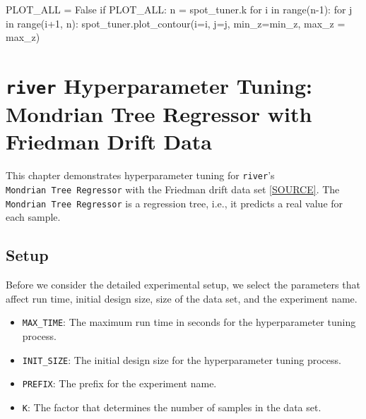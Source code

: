 \documentclass[
  letterpaper,
  DIV=11,
  numbers=noendperiod]{scrreprt}
\newenvironment{Shaded}{\begin{snugshade}}{\end{snugshade}}
\newcommand{\BuiltInTok}[1]{\textcolor[rgb]{0.00,0.23,0.31}{#1}}
\newcommand{\ControlFlowTok}[1]{\textcolor[rgb]{0.00,0.23,0.31}{#1}}
\newcommand{\DecValTok}[1]{\textcolor[rgb]{0.68,0.00,0.00}{#1}}
\newcommand{\KeywordTok}[1]{\textcolor[rgb]{0.00,0.23,0.31}{#1}}
\newcommand{\NormalTok}[1]{\textcolor[rgb]{0.00,0.23,0.31}{#1}}
\newcommand{\OperatorTok}[1]{\textcolor[rgb]{0.37,0.37,0.37}{#1}}
\newcommand{\VariableTok}[1]{\textcolor[rgb]{0.07,0.07,0.07}{#1}}
\providecommand{\tightlist}{%
  \setlength{\itemsep}{0pt}\setlength{\parskip}{0pt}}\usepackage{longtable,booktabs,array}
\begin{document}
\begin{Shaded}
\begin{Highlighting}[]
\NormalTok{PLOT\_ALL }\OperatorTok{=} \VariableTok{False}
\ControlFlowTok{if}\NormalTok{ PLOT\_ALL:}
\NormalTok{    n }\OperatorTok{=}\NormalTok{ spot\_tuner.k}
    \ControlFlowTok{for}\NormalTok{ i }\KeywordTok{in} \BuiltInTok{range}\NormalTok{(n}\OperatorTok{{-}}\DecValTok{1}\NormalTok{):}
        \ControlFlowTok{for}\NormalTok{ j }\KeywordTok{in} \BuiltInTok{range}\NormalTok{(i}\OperatorTok{+}\DecValTok{1}\NormalTok{, n):}
\NormalTok{            spot\_tuner.plot\_contour(i}\OperatorTok{=}\NormalTok{i, j}\OperatorTok{=}\NormalTok{j, min\_z}\OperatorTok{=}\NormalTok{min\_z, max\_z }\OperatorTok{=}\NormalTok{ max\_z)}
\end{Highlighting}
\end{Shaded}

\hypertarget{sec-river-hpt-51}{%
\chapter{\texorpdfstring{\texttt{river} Hyperparameter Tuning: Mondrian
Tree Regressor with Friedman Drift
Data}{river Hyperparameter Tuning: Mondrian Tree Regressor with Friedman Drift Data}}\label{sec-river-hpt-51}}

This chapter demonstrates hyperparameter tuning for \texttt{river}'s
\texttt{Mondrian\ Tree\ Regressor} with the Friedman drift data set
\href{https://riverml.xyz/0.18.0/api/datasets/synth/FriedmanDrift/}{{[}SOURCE{]}}.
The \texttt{Mondrian\ Tree\ Regressor} is a regression tree, i.e., it
predicts a real value for each sample.

\hypertarget{sec-setup-51}{%
\section{Setup}\label{sec-setup-51}}

Before we consider the detailed experimental setup, we select the
parameters that affect run time, initial design size, size of the data
set, and the experiment name.

\begin{itemize}
\tightlist
\item
  \texttt{MAX\_TIME}: The maximum run time in seconds for the
  hyperparameter tuning process.
\item
  \texttt{INIT\_SIZE}: The initial design size for the hyperparameter
  tuning process.
\item
  \texttt{PREFIX}: The prefix for the experiment name.
\item
  \texttt{K}: The factor that determines the number of samples in the
  data set.
\end{itemize}
\end{document}
